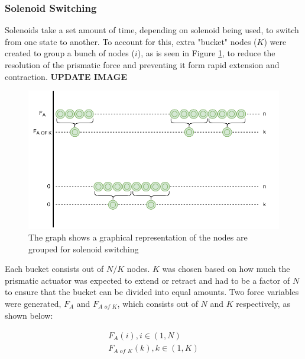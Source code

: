         \subsubsection{Solenoid Switching} \label{Sol Switching}
        Solenoids take a set amount of time, depending on solenoid being used, to switch from one state to another. To account for this, extra "bucket" nodes ($K$) were created to group a bunch of nodes ($i$), as is seen in Figure \ref{fig:switching}, to reduce the resolution of the prismatic force and preventing it form rapid extension and contraction. \textbf{UPDATE IMAGE}
       
        \begin{figure}[ht!]
            \centering
            \includegraphics[width=\textwidth]{figs/switching}
            \caption{The graph shows a graphical representation of the nodes are grouped for solenoid switching}
            \label{fig:switching}
        \end{figure}
        
        Each bucket consists out of $N/K$ nodes. $K$ was chosen based on how much the prismatic actuator was expected to extend or retract and had to be a factor of $N$ to ensure that the bucket can be divided into equal amounts. Two force variables were generated, $F_A$ and $F_{\textit{A of K}}$, which consists out of $N$ and $K$ respectively, as shown below:
        
        \begin{equation}
            \begin{split}
                F_A(i), i \in(1, N) \\
                F_{\textit{A of K}}(k), k \in(1, K)
            \end{split}
        \end{equation}
        

